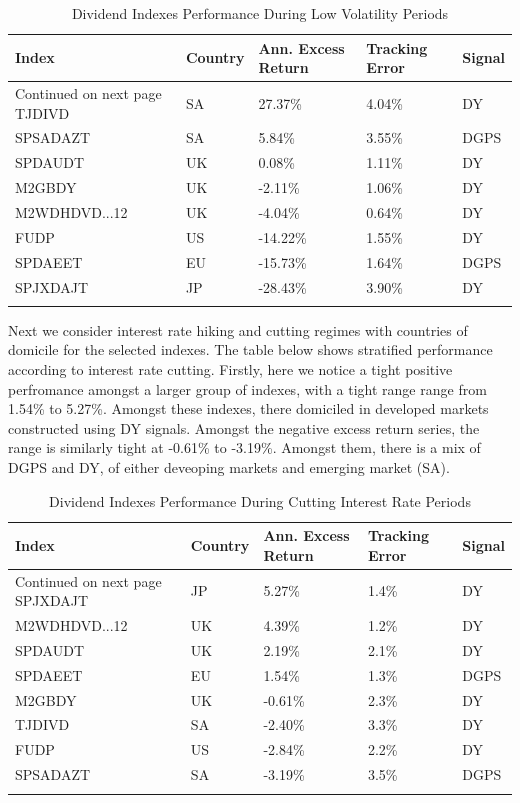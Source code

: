 \documentclass[11pt,preprint, authoryear]{elsarticle}
\numberwithin{equation}{section}
\numberwithin{figure}{section}
\numberwithin{table}{section}
\begin{document}
\begingroup\fontsize{12pt}{13pt}\selectfont
\begin{longtable}{lllll}
  \toprule
Index & Country & Ann. Excess Return & Tracking Error & Signal \\ 
  \hline 
\endhead 
\hline 
{\footnotesize Continued on next page} 
\endfoot 
\endlastfoot 
 \midrule
TJDIVD & SA &  27.37\% & 4.04\% & DY \\ 
  SPSADAZT & SA &   5.84\% & 3.55\% & DGPS \\ 
  SPDAUDT & UK &   0.08\% & 1.11\% & DY \\ 
  M2GBDY & UK &  -2.11\% & 1.06\% & DY \\ 
  M2WDHDVD...12 & UK &  -4.04\% & 0.64\% & DY \\ 
  FUDP & US & -14.22\% & 1.55\% & DY \\ 
  SPDAEET & EU & -15.73\% & 1.64\% & DGPS \\ 
  SPJXDAJT & JP & -28.43\% & 3.90\% & DY \\ 
   \bottomrule
\caption{Dividend Indexes Performance During Low Volatility Periods} 
\end{longtable}
\endgroup

Next we consider interest rate hiking and cutting regimes with countries
of domicile for the selected indexes. The table below shows stratified
performance according to interest rate cutting. Firstly, here we notice
a tight positive perfromance amongst a larger group of indexes, with a
tight range range from 1.54\% to 5.27\%. Amongst these indexes, there
domiciled in developed markets constructed using DY signals. Amongst the
negative excess return series, the range is similarly tight at -0.61\%
to -3.19\%. Amongst them, there is a mix of DGPS and DY, of either
deveoping markets and emerging market (SA).

\begingroup\fontsize{12pt}{13pt}\selectfont
\begin{longtable}{lllll}
  \toprule
Index & Country & Ann. Excess Return & Tracking Error & Signal \\ 
  \hline 
\endhead 
\hline 
{\footnotesize Continued on next page} 
\endfoot 
\endlastfoot 
 \midrule
SPJXDAJT & JP &  5.27\% & 1.4\% & DY \\ 
  M2WDHDVD...12 & UK &  4.39\% & 1.2\% & DY \\ 
  SPDAUDT & UK &  2.19\% & 2.1\% & DY \\ 
  SPDAEET & EU &  1.54\% & 1.3\% & DGPS \\ 
  M2GBDY & UK & -0.61\% & 2.3\% & DY \\ 
  TJDIVD & SA & -2.40\% & 3.3\% & DY \\ 
  FUDP & US & -2.84\% & 2.2\% & DY \\ 
  SPSADAZT & SA & -3.19\% & 3.5\% & DGPS \\ 
   \bottomrule
\caption{Dividend Indexes Performance During Cutting Interest Rate Periods} 
\end{longtable}
\endgroup
\end{document}
